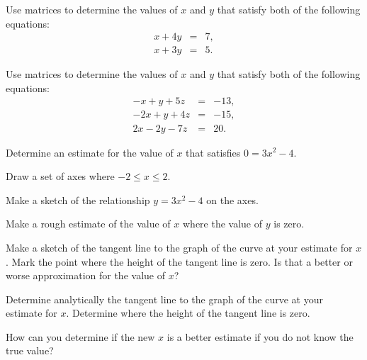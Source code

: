 \begin{problem}
\item Use matrices to determine the values of $x$ and $y$ that satisfy
  both of the following equations:
  \begin{eqnarray*}
    x + 4y & = & 7, \\
    x + 3y & = & 5.
  \end{eqnarray*}

  \vfill

  \clearpage

\item Use matrices to determine the values of $x$ and $y$ that satisfy
  both of the following equations:
  \begin{eqnarray*}
     -x +  y + 5z & = & -13, \\
    -2x +  y + 4z & = & -15, \\
     2x - 2y - 7z & = & 20.
  \end{eqnarray*}

  \vfill

  \clearpage

\item Determine an estimate for the value of $x$ that satisfies
  $0=3x^2-4$.
  \begin{subproblem}
  \item Draw a set of axes where $-2\leq x \leq 2$. 


    \vfill

  \item Make a sketch of the relationship $y=3x^2-4$ on the axes.
  \item Make a rough estimate of the value of $x$ where the value of
    $y$ is zero.
    \clearpage

  \item Make a sketch of the tangent line to the graph of the curve
    at your estimate for $x$. Mark the point where the height of the
    tangent line is zero. Is that a better or worse approximation for
    the value of $x$?
    \vspace{2em}

  \item Determine analytically the tangent line to the graph of the curve
    at your estimate for $x$. Determine where the height of the
    tangent line is zero. 

    \vfill

  \item How can you determine if the new $x$ is a better estimate if
    you do not know the true value?

  \end{subproblem}

\end{problem}


